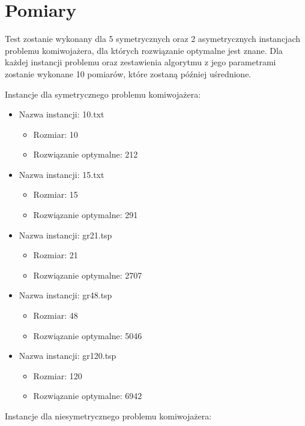 \documentclass[12pt,a4paper,titlepage]{article}
\begin{document}
\section{Pomiary}
Test zostanie wykonany dla 5 symetrycznych oraz 2 asymetrycznych instancjach problemu komiwojażera, dla których rozwiązanie optymalne jest znane. Dla każdej instancji problemu oraz zestawienia algorytmu z jego parametrami zostanie wykonane 10 pomiarów, które zostaną później uśrednione.
\newpage
\begin{flushleft}
Instancje dla symetrycznego problemu komiwojażera:
\end{flushleft}
\begin{itemize}
    \item Nazwa instancji: 10.txt
    \begin{itemize}
        \item Rozmiar: 10
        \item Rozwiązanie optymalne: 212
    \end{itemize}
    \item Nazwa instancji: 15.txt
    \begin{itemize}
        \item Rozmiar: 15
        \item Rozwiązanie optymalne: 291
    \end{itemize}
    \item Nazwa instancji: gr21.tsp
    \begin{itemize}
        \item Rozmiar: 21
        \item Rozwiązanie optymalne: 2707
    \end{itemize}
    \item Nazwa instancji: gr48.tsp
    \begin{itemize}
        \item Rozmiar: 48
        \item Rozwiązanie optymalne: 5046
    \end{itemize}
    \item Nazwa instancji: gr120.tsp
    \begin{itemize}
        \item Rozmiar: 120
        \item Rozwiązanie optymalne: 6942
    \end{itemize}
\end{itemize}
\vspace{1cm}
Instancje dla niesymetrycznego problemu komiwojażera:
\end{document}
